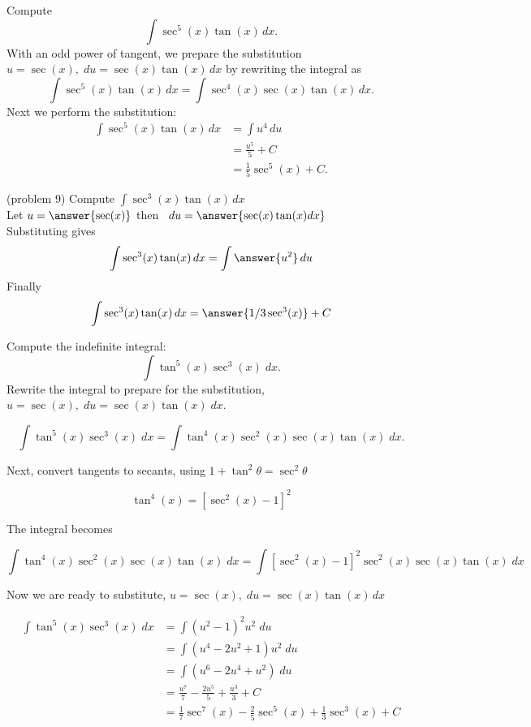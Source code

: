 \documentclass{ximera}
\begin{document}
\begin{example}[example 9]

Compute
\[
\int \sec^5(x) \tan(x) \, dx.
\]
With an odd power of tangent, we prepare the substitution $u = \sec(x), \; du = \sec(x)\tan(x) \, dx$ by rewriting the integral as
\[
\int \sec^5(x) \tan(x) \, dx = \int \sec^4(x) \sec(x) \tan(x) \, dx.
\]
Next we perform the substitution:
\begin{align*}
\int \sec^5(x) \tan(x) \, dx &= \int u^4 \, du\\
                             &= \frac{u^5}{5} + C\\
                             &= \frac15 \sec^5(x) + C.
\end{align*}

\end{example}


\begin{problem}(problem 9)
Compute $\displaystyle{\int \sec^3(x) \tan(x) \, dx}$\\
Let $u = \answer{\sec(x)}$ then \, $du = \answer{\sec(x)\tan(x) dx}$\\
Substituting gives 
\[
\int \sec^3(x) \tan(x) \, dx = \int \answer{u^2} \, du
\]
Finally
\[
\int \sec^3(x) \tan(x) \, dx = \answer{1/3 \sec^3(x)} + C
\]

\end{problem}


\begin{example}[example 10]
Compute the indefinite integral:
\[
\int \tan^5(x) \sec^3(x)\;dx.
\]
Rewrite the integral to prepare for the substitution, $u = \sec(x), \;du = \sec(x) \tan(x) \; dx$.

\[
\int \tan^5(x) \sec^3(x)\;dx = \int \tan^4(x) \sec^2(x) \sec(x) \tan(x)\;dx.
\]

Next, convert tangents to secants, using $1+ \tan^2 \theta = \sec^2 \theta$

\[
\tan^4(x) = \left[\sec^2(x) - 1\right]^2
\]

The integral becomes

\[
 \int \tan^4(x) \sec^2(x) \sec(x) \tan(x)\;dx = \int \left[\sec^2(x) -1\right]^2 \sec^2(x) \sec(x) \tan(x)\;dx
\]

Now we are ready to substitute, $u = \sec(x), \; du = \sec(x) \tan(x) \, dx$

\begin{align*}
\int \tan^5(x) \sec^3(x)\;dx &= \int \left(u^2 -1\right)^2 u^2 \; du \\
                             &= \int \left(u^4 - 2u^2 +1\right) u^2 \; du \\
                             &= \int \left(u^6 - 2u^4 +u^2\right) \; du \\
                             &=  \frac{u^7}{7} - \frac{2u^5}{5} + \frac{u^3}{3} + C  \\
                             &= \frac17\sec^7(x) - \frac25 \sec^5(x) + \frac13 \sec^3(x) + C
\end{align*}
\end{example}
\end{document}
